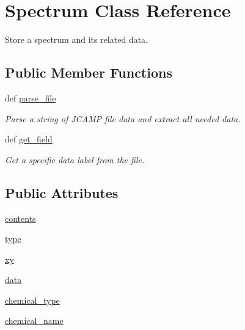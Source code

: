 \hypertarget{classbackend_1_1_spectrum}{
\section{Spectrum Class Reference}
\label{classbackend_1_1_spectrum}
}


Store a spectrum and its related data.  
\subsection*{Public Member Functions}
\begin{DoxyCompactItemize}
\item 
def \hyperlink{classbackend_1_1_spectrum_a14401ccceaf67f005506de0a8320b089}{parse\_\-file}
\begin{DoxyCompactList}\small\item\em Parse a string of JCAMP file data and extract all needed data. \item\end{DoxyCompactList}\item 
def \hyperlink{classbackend_1_1_spectrum_af50426ecd14fc9667344dbf5407fb487}{get\_\-field}
\begin{DoxyCompactList}\small\item\em Get a specific data label from the file. \item\end{DoxyCompactList}\end{DoxyCompactItemize}
\subsection*{Public Attributes}
\begin{DoxyCompactItemize}
\item 
\hyperlink{classbackend_1_1_spectrum_aa6082c83a20a90e5a2ab9f216961972f}{contents}
\item 
\hyperlink{classbackend_1_1_spectrum_a7aead736a07eaf25623ad7bfa1f0ee2d}{type}
\item 
\hyperlink{classbackend_1_1_spectrum_a3f6f55ba521257932bb08684e0181fa1}{xy}
\item 
\hyperlink{classbackend_1_1_spectrum_a511ae0b1c13f95e5f08f1a0dd3da3d93}{data}
\item 
\hyperlink{classbackend_1_1_spectrum_ab23a1bfe0956557e254961031d578c23}{chemical\_\-type}
\item 
\hyperlink{classbackend_1_1_spectrum_a77c112c599aae1eeb8d54936bb435177}{chemical\_\-name}
\end{DoxyCompactItemize}
